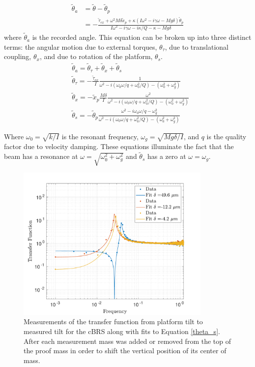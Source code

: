 \documentclass [12pt, proquest]{uwthesis}[2019]
\begin{document}
\begin{align}
\tilde{\theta}_a &=\tilde{\theta}-\tilde{\theta}_p\\
&= -\frac{\tilde{\tau}_{ex}+\omega^2 M \delta \tilde{x}_p+\kappa (I\omega^2-i\gamma \omega -Mg\delta) \tilde{\theta}_p}{I\omega^2-i \gamma \omega -i \kappa /Q-\kappa -Mg\delta}
\end{align}
where $\tilde{\theta}_a$ is the recorded angle. This equation can be broken up into three distinct terms: the angular motion due to external torques, $\theta_\tau$, due to translational coupling, $\theta_x$, and due to rotation of the platform, $\theta_s$.
\begin{align}
&\tilde{\theta}_a =\tilde{\theta}_\tau+\tilde{\theta}_x+\tilde{\theta}_{s} \label{theta_A} \\ 
&\tilde{\theta}_\tau= -\frac{\tilde{\tau}_{ex}}{I}\frac{1}{\omega^2-i (\omega_0 \omega/q+\omega_0^2/Q)-(\omega_0^2+\omega_g^2)}\\
&\tilde{\theta}_x= -\tilde{x}_p\frac{M\delta}{I} \frac{\omega^2}{\omega^2-i (\omega_0 \omega/q+\omega_0^2/Q)-(\omega_0^2+\omega_g^2)}\\
&\tilde{\theta}_{s}= -\tilde{\theta}_p\frac{\omega^2-i\omega_0 \omega/q-\omega_g^2}{\omega^2-i (\omega_0 \omega/q+\omega_0^2/Q)-(\omega_0^2+\omega_g^2)}\label{theta_s}
\end{align}

Where $\omega_0=\sqrt{k/I}$ is the resonant frequency, $\omega_g=\sqrt{M g \delta/I}$, and $q$ is the quality factor due to velocity damping. These equations illuminate the fact that the beam has a resonance at $\omega=\sqrt{\omega_0^2+\omega_g^2}$ and $\tilde{\theta}_s$ has a zero at $\omega=\omega_g$. 


\begin{figure}[!h]
\begin{center}
 \includegraphics[width=0.85\textwidth]{cBRS_TransferFunction.pdf}
\caption[Transfer function from platform tilt to measured tilt for the cBRS]{Measurements of the transfer function from platform tilt to measured tilt for the cBRS along with fits to Equation \ref{theta_s}. After each measurement mass was added or removed from the top of the proof mass in order to shift the vertical position of its center of mass.}
\label{TransferFunction}
\end{center}
\end{figure}
\end{document}
